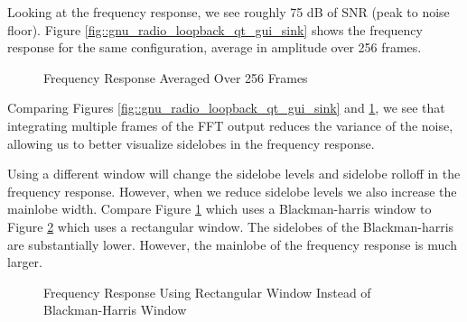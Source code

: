 \documentclass{article}
\begin{document}
Looking at the frequency response, we see roughly 75 dB of SNR (peak to noise floor). Figure \ref{fig::gnu_radio_loopback_qt_gui_sink} shows the frequency response for the same configuration, average in amplitude over 256 frames.

\begin{figure}[H]
	\centerline{}
	\caption{Frequency Response Averaged Over 256 Frames}
	\label{fig::gnu_radio_loopback_qt_gui_sink_avg_256}
\end{figure}

Comparing Figures \ref{fig::gnu_radio_loopback_qt_gui_sink} and \ref{fig::gnu_radio_loopback_qt_gui_sink_avg_256}, we see that integrating multiple frames of the FFT output reduces the variance of the noise, allowing us to better visualize sidelobes in the frequency response. 

Using a different window will change the sidelobe levels and sidelobe rolloff in the frequency response. However, when we reduce sidelobe levels we also increase the mainlobe width. Compare Figure \ref{fig::gnu_radio_loopback_qt_gui_sink_avg_256} which uses a Blackman-harris window to Figure \ref{fig::gnu_radio_loopback_qt_gui_sink_rect_win} which uses a rectangular window. The sidelobes of the Blackman-harris are substantially lower. However, the mainlobe of the frequency response is much larger.

\begin{figure}[H]
	\centerline{}
	\caption{Frequency Response Using Rectangular Window Instead of Blackman-Harris Window}
	\label{fig::gnu_radio_loopback_qt_gui_sink_rect_win}
\end{figure}
\end{document}
